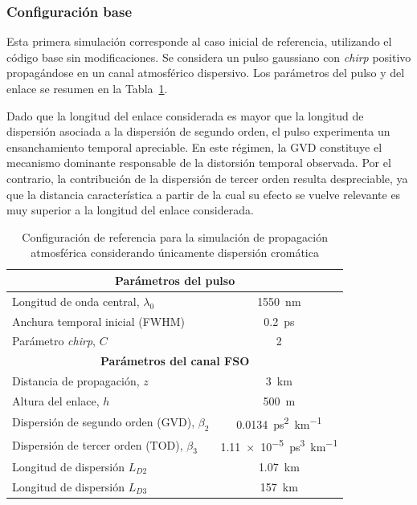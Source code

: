 \subsubsection*{Configuración base}
Esta primera simulación corresponde al caso inicial de referencia, utilizando el código base sin modificaciones. Se considera un pulso gaussiano con \textit{chirp} positivo propagándose en un canal atmosférico dispersivo. Los parámetros del pulso y del enlace se resumen en la Tabla~\ref{config_referencia_atm}.

Dado que la longitud del enlace considerada es mayor que la longitud de dispersión asociada a la dispersión de segundo orden, el pulso experimenta un ensanchamiento temporal apreciable. En este régimen, la GVD constituye el mecanismo dominante responsable de la distorsión temporal observada. Por el contrario, la contribución de la dispersión de tercer orden resulta despreciable, ya que la distancia característica a partir de la cual su efecto se vuelve relevante es muy superior a la longitud del enlace considerada.

\begin{table}[H]
\centering
\renewcommand{\arraystretch}{1.2}
\begin{tabular}{|l|c|}
\hline
\multicolumn{2}{|c|}{\textbf{Parámetros del pulso}} \\
\hline
Longitud de onda central, $\lambda_0$ & \SI{1550}{\nano\meter} \\
Anchura temporal inicial (FWHM) & \SI{0.2}{\pico\second} \\
Parámetro \textit{chirp}, $C$ & 2 \\
\hline
\multicolumn{2}{|c|}{\textbf{Parámetros del canal FSO}} \\
\hline
Distancia de propagación, $z$ & \SI{3}{\kilo\meter} \\
Altura del enlace, $h$ & \SI{500}{\meter} \\
Dispersión de segundo orden (GVD), $\beta_2$ & \SI{0.0134}{\pico\second\squared\per\kilo\meter} \\
Dispersión de tercer orden (TOD), $\beta_3$ & \SI{1.11e-5}{\pico\second\cubed\per\kilo\meter} \\
Longitud de dispersión $L_{D2}$ & \SI{1.07}{\kilo\meter} \\
Longitud de dispersión $L_{D3}$ & \SI{157}{\kilo\meter} \\
\hline
\end{tabular}
\caption{Configuración de referencia para la simulación de propagación atmosférica considerando únicamente dispersión cromática}
\label{config_referencia_atm}
\end{table}

